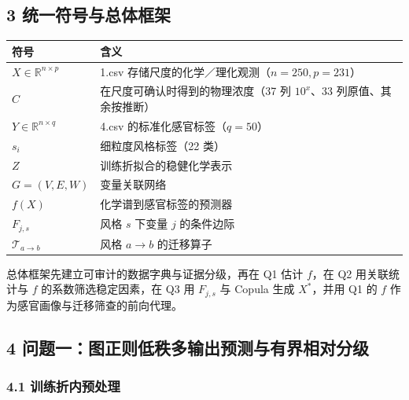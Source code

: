 \documentclass[
  11pt,
]{article}
\newcounter{none} %
\begin{document}
\subsection{3
统一符号与总体框架}\label{ux7edfux4e00ux7b26ux53f7ux4e0eux603bux4f53ux6846ux67b6}

{\def\LTcaptype{none} %
\begin{longtable}[]{@{}
  >{\raggedright\arraybackslash}p{}
  >{\raggedright\arraybackslash}p{}@{}}
\toprule\noalign{}
\begin{minipage}[b]{\linewidth}\raggedright
符号
\end{minipage} & \begin{minipage}[b]{\linewidth}\raggedright
含义
\end{minipage} \\
\midrule\noalign{}
\endhead
\bottomrule\noalign{}
\endlastfoot
\(X\in\mathbb R^{n\times p}\) & 1.csv
存储尺度的化学／理化观测（\(n=250,p=231\)） \\
\(C\) & 在尺度可确认时得到的物理浓度（37 列 \(10^x\)、33
列原值、其余按推断） \\
\(Y\in\mathbb R^{n\times q}\) & 4.csv 的标准化感官标签（\(q=50\)） \\
\(s_i\) & 细粒度风格标签（22 类） \\
\(Z\) & 训练折拟合的稳健化学表示 \\
\(G=(V,E,W)\) & 变量关联网络 \\
\(f(X)\) & 化学谱到感官标签的预测器 \\
\(F_{j,s}\) & 风格 \(s\) 下变量 \(j\) 的条件边际 \\
\(\mathcal T_{a\to b}\) & 风格 \(a\to b\) 的迁移算子 \\
\end{longtable}
}

总体框架先建立可审计的数据字典与证据分级，再在 Q1 估计 \(f\)，在 Q2
用关联统计与 \(f\) 的系数筛选稳定因素，在 Q3 用 \(F_{j,s}\) 与 Copula
生成 \(X^*\)，并用 Q1 的 \(f\) 作为感官画像与迁移筛查的前向代理。

\subsection{4
问题一：图正则低秩多输出预测与有界相对分级}\label{ux95eeux9898ux4e00ux56feux6b63ux5219ux4f4eux79e9ux591aux8f93ux51faux9884ux6d4bux4e0eux6709ux754cux76f8ux5bf9ux5206ux7ea7}

\subsubsection{4.1
训练折内预处理}\label{ux8badux7ec3ux6298ux5185ux9884ux5904ux7406}
\end{document}
